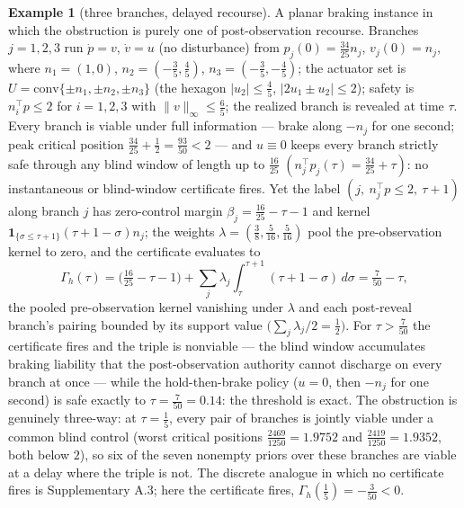 \documentclass[10pt,twocolumn]{article}
\theoremstyle{definition}
\newtheorem{example}{Example}
\begin{document}
\begin{example}[three branches, delayed recourse]\label{ex:three-branch}
A planar braking instance in which the obstruction is purely one of
post-observation recourse. Branches \(j = 1, 2, 3\) run \(\dot p = v\),
\(\dot v = u\) (no disturbance) from
\(p_j(0) = \tfrac{34}{25} n_j\), \(v_j(0) = n_j\), where
\(n_1 = (1, 0)\), \(n_2 = (-\tfrac{3}{5}, \tfrac{4}{5})\),
\(n_3 = (-\tfrac{3}{5}, -\tfrac{4}{5})\); the actuator set is
\(U = \mathrm{conv}\{\pm n_1, \pm n_2, \pm n_3\}\) (the hexagon
\(|u_2| \le \tfrac45\), \(|2u_1 \pm u_2| \le 2\)); safety is
\(n_i^{\top} p \le 2\) for \(i = 1, 2, 3\) with
\(\|v\|_\infty \le \tfrac65\); the realized branch is revealed at time
\(\tau\). Every branch is viable under full information --- brake along
\(-n_j\) for one second; peak critical position
\(\tfrac{34}{25} + \tfrac12 = \tfrac{93}{50} < 2\) --- and \(u \equiv 0\)
keeps every branch strictly safe through any blind window of length up to
\(\tfrac{16}{25}\) \((n_j^{\top} p_j(\tau) = \tfrac{34}{25} + \tau)\):
no instantaneous or blind-window certificate fires. Yet the label
\((j,\ n_j^{\top} p \le 2,\ \tau + 1)\) along branch \(j\) has
zero-control margin \(\beta_j = \tfrac{16}{25} - \tau - 1\) and kernel
\(\mathbf{1}_{\{\sigma \le \tau + 1\}} (\tau + 1 - \sigma) n_j\); the
weights \(\lambda = (\tfrac38, \tfrac5{16}, \tfrac5{16})\) pool the
pre-observation kernel to zero, and the certificate evaluates to \[\Gamma_{h}(\tau) = \Big(\tfrac{16}{25} - \tau - 1\Big) + \sum_{j} \lambda_{j} \int_{\tau}^{\tau+1} (\tau + 1 - \sigma)\, d\sigma = \tfrac{7}{50} - \tau,\] the pooled pre-observation kernel vanishing under \(\lambda\) and each post-reveal branch's pairing bounded by its support value \(\big(\sum_{j} \lambda_{j}/2 = \tfrac{1}{2}\big)\). For \(\tau > \tfrac{7}{50}\) the certificate fires and the triple is nonviable --- the blind window
accumulates braking liability that the post-observation authority cannot
discharge on every branch at once --- while the hold-then-brake policy
(\(u = 0\), then \(-n_j\) for one second) is safe exactly to
\(\tau = \tfrac{7}{50} = 0.14\): the threshold is exact. The obstruction
is genuinely three-way: at \(\tau = \tfrac15\), every pair of branches is
jointly viable under a common blind control (worst critical positions
\(\tfrac{2469}{1250} = 1.9752\) and \(\tfrac{2419}{1250} = 1.9352\), both
below \(2\)), so six of the seven nonempty priors over these branches are
viable at a delay where the triple is not. The discrete analogue in which no
certificate fires is Supplementary A.3; here the certificate fires, \(\Gamma_{h}(\tfrac15) = -\tfrac3{50} < 0\).
\end{example}
\end{document}
